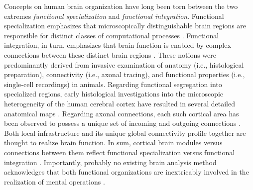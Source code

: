 \documentclass{article} %
\begin{document}
Concepts on human brain organization have long been torn
between the two extremes
\textit{functional specialization} and \textit{functional integration}.
Functional specialization emphasizes that microscopically distinguishable
brain regions are responsible for distinct classes of computational 
processes
\cite{kanwisher2010functional}.
Functional integration, in turn, emphasizes that brain function
is enabled by complex connections between these
distinct brain regions \cite{sporns14nn}.
%
These notions were predominantly derived from
invasive examination of anatomy (i.e., histological preparation),
connectivity (i.e., axonal tracing),
and functional properties
(i.e., single-cell recordings) in animals.
Regarding functional segregation into specialized regions,
early histological investigations into the microscopic heterogeneity of
the human cerebral cortex have resulted
in several detailed anatomical maps
\cite{brodmann1909vergleichende}.
Regarding axonal connections,
each such cortical area has been observed
to possess a unique set of incoming and outgoing connections
\cite{passingham2002, young93monkey, scannell95cat}.
%
Both
local
infrastructure
and its unique global connectivity profile
together are thought to realize brain function.
%
In sum,
cortical brain modules versus connections between them
reflect 
functional specialization versus functional integration
\cite{friston2002beyond, mesulam_sensation}.
Importantly,
probably no existing brain analysis method acknowledges that
both functional organizations are inextricably involved
in the realization of mental operations
\cite{tononi1998complexity, saygin2012}.
\end{document}

